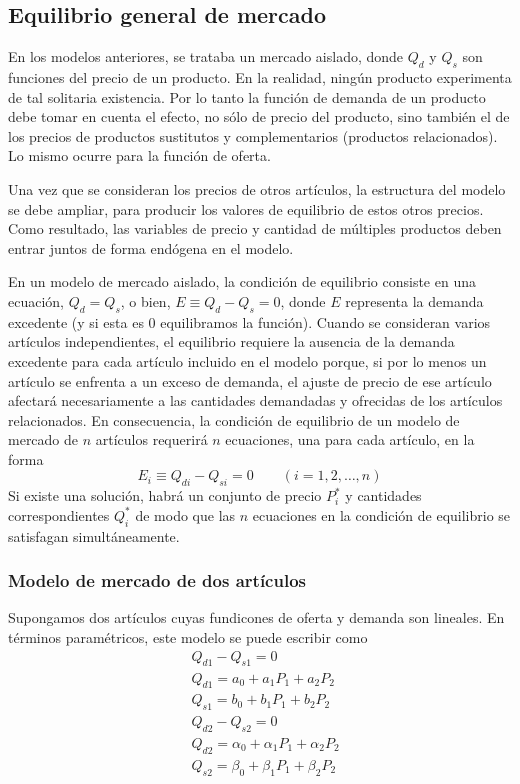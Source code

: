 \subsection{Equilibrio general de mercado}

En los modelos anteriores, se trataba un mercado aislado, donde \(Q_d\) y \(Q_s\) son funciones del precio de un producto. En la realidad, ningún producto experimenta de tal solitaria existencia. Por lo tanto la función de demanda de un producto debe tomar en cuenta el efecto, no sólo de precio del producto, sino también el de los precios de productos sustitutos y complementarios (productos relacionados). Lo mismo ocurre para la función de oferta.

Una vez que se consideran los precios de otros artículos, la estructura del modelo se debe ampliar, para producir los valores de equilibrio de estos otros precios. Como resultado, las variables de precio y cantidad de múltiples productos deben entrar juntos de forma endógena en el modelo.

En un modelo de mercado aislado, la condición de equilibrio consiste en una ecuación, \(Q_d = Q_s\), o bien, \(E \equiv Q_d-Q_s=0 \), donde \(E\) representa la demanda excedente (y si esta es \(0\) equilibramos la función). Cuando se consideran varios artículos independientes, el equilibrio requiere la ausencia de la demanda excedente para cada artículo incluido en el modelo porque, si por lo menos un artículo se enfrenta a un exceso de demanda, el ajuste de precio de ese artículo afectará necesariamente a las cantidades demandadas y ofrecidas de los artículos relacionados. En consecuencia, la condición de equilibrio de un modelo de mercado de \(n\) artículos requerirá \(n\) ecuaciones, una para cada artículo, en la forma 
\[
E_i \equiv Q_{di} - Q_{si} = 0 \qquad (i=1,2,\dots,n)
\]
Si existe una solución, habrá un conjunto de precio \(P_i^\ast\) y cantidades correspondientes \(Q_i^\ast\) de modo que las \(n\) ecuaciones en la condición de equilibrio se satisfagan simultáneamente.


\subsubsection{Modelo de mercado de dos artículos}

Supongamos dos artículos cuyas fundicones de oferta y demanda son lineales. En términos paramétricos, este modelo se puede escribir como 
\begin{equation}
    \begin{aligned}
        & Q_{d1}-Q_{s1}=0 \\
        & Q_{d1}=a_0+a_1P_1+a_2P_2 \\ 
        & Q_{s1}=b_0+b_1P_1+b_2P_2 \\
        & Q_{d2}-Q_{s2}=0 \\
        & Q_{d2}=\alpha_0+\alpha_1P_1+\alpha_2P_2 \\
        & Q_{s2}=\beta_0+\beta_1P_1+\beta_2P_2
    \end{aligned}
\end{equation}

